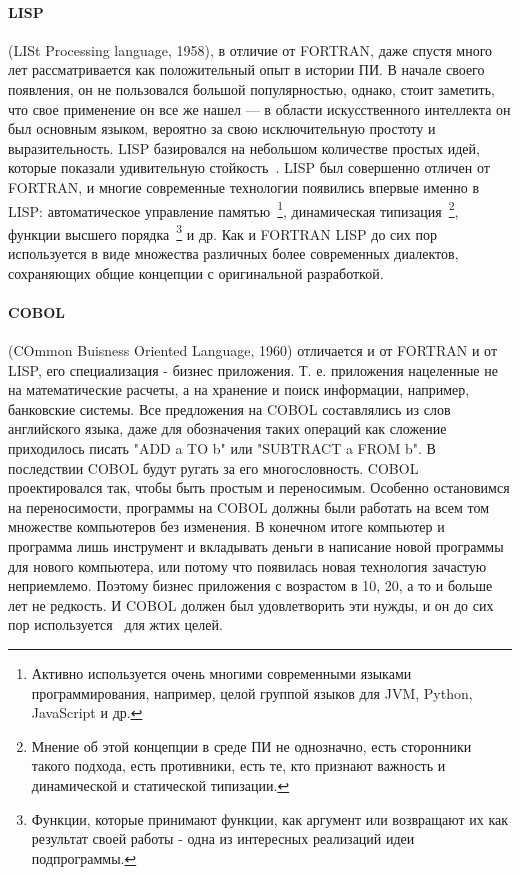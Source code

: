 \paragraph{LISP} (LISt Processing language, 1958), в отличие от FORTRAN, даже спустя много лет рассматривается как положительный опыт в истории ПИ. В начале своего появления, он не пользовался большой популярностью, однако, стоит заметить, что свое применение он все же нашел — в области искусственного интеллекта он был основным языком, вероятно за свою исключительную простоту и выразительность. LISP базировался на небольшом количестве простых идей, которые показали удивительную стойкость~\cite{Dijkstra:1972:HP}. LISP был совершенно отличен от FORTRAN, и многие современные технологии появились впервые именно в LISP: автоматическое управление памятью~\footnote{Активно используется очень многими современными языками программирования, например, целой группой языков для JVM, Python, JavaScript и др.}, динамическая типизация~\footnote{Мнение об этой концепции в среде ПИ не однозначно, есть сторонники такого подхода, есть противники, есть те, кто признают важность и динамической и статической типизации.}, функции высшего порядка~\footnote{Функции, которые принимают функции, как аргумент или возвращают их как результат своей работы - одна из интересных реализаций идеи подпрограммы.} и др. Как и FORTRAN LISP до сих пор используется в виде множества различных более современных диалектов, сохраняющих общие концепции с оригинальной разработкой.

\paragraph{COBOL} (COmmon Buisness Oriented Language, 1960) отличается и от FORTRAN и от LISP, его специализация - бизнес приложения. Т. е. приложения нацеленные не на математические расчеты, а на хранение и поиск информации, например, банковские системы. Все предложения на COBOL составлялись из слов английского языка, даже для обозначения таких операций как сложение приходилось писать "ADD a TO b" или "SUBTRACT a FROM b". В последствии COBOL будут ругать за его многословность. COBOL проектировался так, чтобы быть простым и переносимым. Особенно остановимся на переносимости, программы на COBOL должны были работать на всем том множестве компьютеров без изменения. В конечном итоге компьютер и программа лишь инструмент и вкладывать деньги в написание новой программы для нового компьютера, или потому что появилась новая технология зачастую неприемлемо. Поэтому бизнес приложения с возрастом в 10, 20, а то и больше лет не редкость. И COBOL должен был удовлетворить эти нужды, и он до сих пор используется~\cite{Mitchell:2006:CND} для жтих целей.

